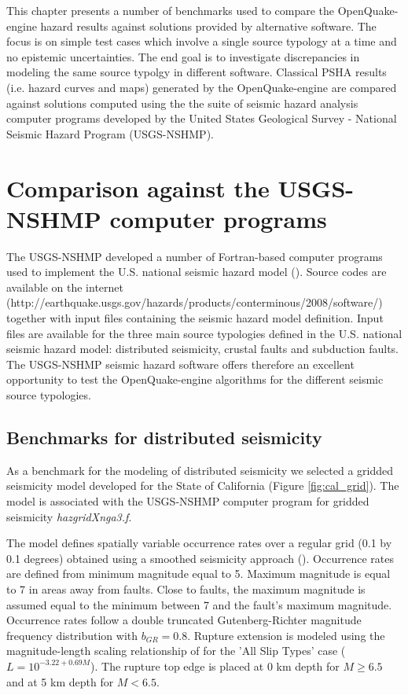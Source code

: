 This chapter presents a number of benchmarks used to compare the OpenQuake-engine
hazard results against solutions provided by alternative software. The focus is on simple test cases which involve a single source typology at a time and no epistemic uncertainties. The end goal is to investigate discrepancies in modeling the same source typolgy in different software. Classical PSHA results (i.e. hazard curves and maps) generated by the OpenQuake-engine are compared against solutions computed using the the suite of seismic hazard analysis computer programs developed by the United States Geological Survey - National Seismic Hazard Program (USGS-NSHMP).
\section{Comparison against the USGS-NSHMP computer programs}
The USGS-NSHMP developed a number of Fortran-based computer programs used to implement the U.S. national seismic hazard model (\cite{petersen2008}). Source codes are available on the internet (http://earthquake.usgs.gov/hazards/products/conterminous/2008/software/) together with input files containing the seismic hazard model definition. Input files are available for the three main source typologies
defined in the U.S. national seismic hazard model: distributed seismicity, crustal faults and subduction faults.
The USGS-NSHMP seismic hazard software offers therefore an excellent opportunity to test the OpenQuake-engine algorithms for the different seismic source typologies.

\subsection{Benchmarks for distributed seismicity}
As a benchmark for the modeling of distributed seismicity we selected a gridded seismicity model developed for the State of California (Figure \ref{fig:cal_grid}). The model is associated with the USGS-NSHMP computer program for gridded seismicity \textit{hazgridXnga3.f}. 

The model defines spatially variable occurrence rates over a regular grid (0.1 by 0.1 degrees) obtained using a smoothed seismicity approach (\cite{frankel1995}). Occurrence rates are defined from minimum magnitude equal to 5. Maximum magnitude is equal to 7 in areas away from faults. Close to faults, the maximum magnitude is assumed equal to the minimum between 7 and the fault's maximum magnitude. Occurrence rates follow a double truncated Gutenberg-Richter magnitude frequency distribution with $b_{GR} = 0.8$. Rupture extension is modeled using the magnitude-length scaling relationship of \citet{wells1994} for the 'All Slip Types' case ($L=10^{-3.22+0.69 M}$). The rupture top edge is placed at 0 km depth for $M \ge 6.5$ and at 5 km depth for  $M < 6.5$.

